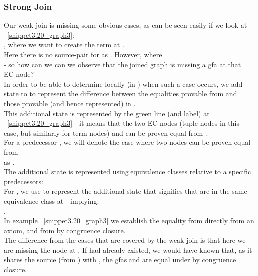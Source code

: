 \subsubsection*{Strong Join}
Our weak join is missing some obvious cases, as can be seen easily if we look at ~\ref{snippet3.20_graph3}:\\
, where we want to create the term  at .\\
Here there is no source-pair for  as .
However,  where \\
 - so how can we can we observe that the joined graph is missing a gfa at that EC-node?\\
In order to be able to determine locally (in ) when such a case occurs, we add state to  to represent the difference between
the equalities provable from  and those provable (and hence represented) in .\\
This additional state is represented by the green line (and label) at ~\ref{snippet3.20_graph3} - it means that the two EC-nodes (tuple nodes in this case, but similarly for term nodes)  and  can be proven equal from .\\
For a predecessor , we will denote the case where two nodes  can be proven equal from \\
  as .\\
The additional state is represented using equivalence classes relative to a specific predecessors:\\
For , we use  to represent the additional state that signifies that  are in the same equivalence class at  - implying:\\
.\\
In example ~\ref{snippet3.20_graph3} we establish the equality  from  directly from an axiom, 
and from  by congruence closure.\\
The difference from the cases that are covered by the weak join is that here we are missing the node  at .
If  had already existed, we would have known that, as it shares the source  (from ) with , the gfas  and  are equal under  by congruence closure.\\
